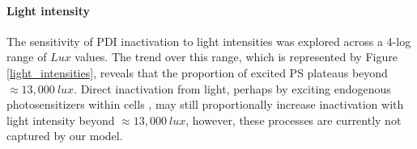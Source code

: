 \paragraph{Light intensity}
The sensitivity of PDI inactivation to light intensities was explored across a 4-log range of $Lux$ values. The trend over this range, which is represented by Figure \ref{light_intensities}, reveals that the proportion of excited PS plateaus beyond $\approx 13,000~lux$. Direct inactivation from light, perhaps by exciting endogenous photosensitizers within cells \cite{Lippincott-schwartz2003PhotobleachingTechniques,Jin1995PhotolysisSolution,Itoh2001PhotodynamicPatients}, may still proportionally increase inactivation with light intensity beyond $\approx 13,000~lux$, however, these processes are currently not captured by our model. 

